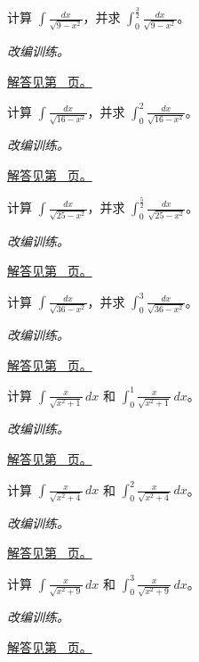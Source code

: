 \documentclass[12pt,fontset=fandol]{ctexart}
\begin{document}
\begin{example}[圆根式与三角换元]\label{ex:c14q15}
计算 $\displaystyle\int\frac{dx}{\sqrt{9-x^2}}$，并求 $\displaystyle\int_0^{\frac{3}{2}}\frac{dx}{\sqrt{9-x^2}}$。
\par\textit{改编训练。}\par\hyperref[ans:c14q15]{解答见第~\pageref{ans:c14q15} 页。}
\end{example}
\begin{example}[圆根式与三角换元]\label{ex:c14q16}
计算 $\displaystyle\int\frac{dx}{\sqrt{16-x^2}}$，并求 $\displaystyle\int_0^{2}\frac{dx}{\sqrt{16-x^2}}$。
\par\textit{改编训练。}\par\hyperref[ans:c14q16]{解答见第~\pageref{ans:c14q16} 页。}
\end{example}
\begin{example}[圆根式与三角换元]\label{ex:c14q17}
计算 $\displaystyle\int\frac{dx}{\sqrt{25-x^2}}$，并求 $\displaystyle\int_0^{\frac{5}{2}}\frac{dx}{\sqrt{25-x^2}}$。
\par\textit{改编训练。}\par\hyperref[ans:c14q17]{解答见第~\pageref{ans:c14q17} 页。}
\end{example}
\begin{example}[圆根式与三角换元]\label{ex:c14q18}
计算 $\displaystyle\int\frac{dx}{\sqrt{36-x^2}}$，并求 $\displaystyle\int_0^{3}\frac{dx}{\sqrt{36-x^2}}$。
\par\textit{改编训练。}\par\hyperref[ans:c14q18]{解答见第~\pageref{ans:c14q18} 页。}
\end{example}
\begin{example}[双曲型根式的直接代换]\label{ex:c14q19}
计算 $\displaystyle\int\frac{x}{\sqrt{x^2+1}}\,dx$ 和 $\displaystyle\int_0^{1}\frac{x}{\sqrt{x^2+1}}\,dx$。
\par\textit{改编训练。}\par\hyperref[ans:c14q19]{解答见第~\pageref{ans:c14q19} 页。}
\end{example}
\begin{example}[双曲型根式的直接代换]\label{ex:c14q20}
计算 $\displaystyle\int\frac{x}{\sqrt{x^2+4}}\,dx$ 和 $\displaystyle\int_0^{2}\frac{x}{\sqrt{x^2+4}}\,dx$。
\par\textit{改编训练。}\par\hyperref[ans:c14q20]{解答见第~\pageref{ans:c14q20} 页。}
\end{example}
\begin{example}[双曲型根式的直接代换]\label{ex:c14q21}
计算 $\displaystyle\int\frac{x}{\sqrt{x^2+9}}\,dx$ 和 $\displaystyle\int_0^{3}\frac{x}{\sqrt{x^2+9}}\,dx$。
\par\textit{改编训练。}\par\hyperref[ans:c14q21]{解答见第~\pageref{ans:c14q21} 页。}
\end{example}
\end{document}
